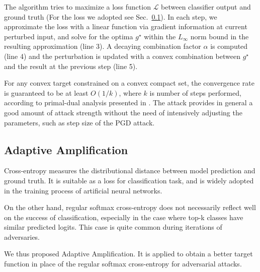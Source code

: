 \documentclass{article}
\begin{document}
        The algorithm tries to maximize a loss function $\mathcal{L}$ between classifier output and ground truth (For the loss we adopted see Sec.\ \ref{sub:AdAmp}). In each step, we approximate the loss with a linear function via gradient information at current perturbed input, and solve for the optima $g^\star$ within the $L_\infty$ norm bound in the resulting approximation (line 3). A decaying combination factor $\alpha$ is computed (line 4) and the perturbation is updated with a convex combination between $g^\star$ and the result at the previous step (line 5).
        
        For any convex target constrained on a convex compact set, the convergence rate is guaranteed to be at least $O(1/k)$, where $k$ is number of steps performed, according to primal-dual analysis presented in \cite{jaggi2013revisiting}. The attack provides in general a good amount of attack strength without the need of intensively adjusting the parameters, such as step size of the PGD attack.
    

    \subsection{Adaptive Amplification} \label{sub:AdAmp}
        Cross-entropy measures the distributional distance between model prediction and ground truth. It is suitable as a loss for classification task, and is widely adopted in the training process of artificial neural networks.
        
        On the other hand, regular softmax cross-entropy does not necessarily reflect well on the success of classification, especially in the case where top-k classes have similar predicted logits. This case is quite common during iterations of adversaries.
        
        We thus proposed Adaptive Amplification. It is applied to obtain a better target function in place of the regular softmax cross-entropy for adversarial attacks.
        
\end{document}
